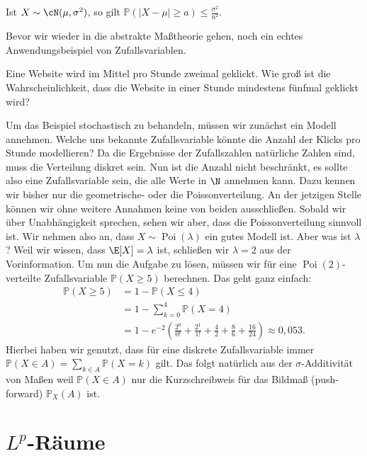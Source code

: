 \begin{beispiel1}
	Ist $ X \sim \cN(\mu, \sigma^2)$, so gilt $ \mathbb{P}(|X - \mu| \geq a) \leq \frac{\sigma^2}{a^2}$.
\end{beispiel1}
Bevor wir wieder in die abstrakte Ma\ss theorie gehen, noch ein echtes Anwendungsbeispiel von Zufallsvariablen.
\begin{beispiel}
	Eine Website wird im Mittel pro Stunde zweimal geklickt. Wie groß ist die Wahrscheinlichkeit, dass die Website in einer Stunde mindestens fünfmal geklickt wird?\smallskip
	
	Um das Beispiel stochastisch zu behandeln, m\"ussen wir zun\"achst ein Modell annehmen. Welche uns bekannte Zufallsvariable k\"onnte die Anzahl der Klicks pro Stunde modellieren? Da die Ergebnisse der Zufallszahlen nat\"urliche Zahlen sind, muss die Verteilung diskret sein. Nun ist die Anzahl nicht beschr\"ankt, es sollte also eine Zufallsvariable sein, die alle Werte in $\N$ annehmen kann. Dazu kennen wir bisher nur die geometrische- oder die Poissonverteilung. An der jetzigen Stelle k\"onnen wir ohne weitere Annahmen keine von beiden ausschlie\ss en. Sobald wir \"uber Unabh\"angigkeit sprechen, sehen wir aber, dass die Poissonverteilung sinnvoll ist. Wir nehmen also an, dass $X\sim \operatorname{Poi}(\lambda)$ ein gutes Modell ist. Aber was ist $\lambda$? Weil wir wissen, dass $\E[X]=\lambda$ ist, schlie\ss en wir $\lambda=2$ aus der Vorinformation. Um nun die Aufgabe zu l\"osen, m\"ussen wir f\"ur eine $\operatorname{Poi}(2)$-verteilte Zufallsvariable $\mathbb P(X\geq 5)$ berechnen. Das geht ganz einfach:
	\begin{align*}
	\mathbb{P}(X \geq 5) &= 1 - \mathbb{P}(X \leq 4)\\
	& = 1 - \sum\limits_{k=0}^{4} \mathbb{P}(X = 4)\\ 
	&= 1 - e^{-2} \left(\frac{2^0}{0!} + \frac{2^1}{1!} + \frac{4}{2} + \frac{8}{6} + \frac{16}{24}\right) \approx 0,053.
	\end{align*} 
	Hierbei haben wir genutzt, dass f\"ur eine diskrete Zufallsvariable immer $\mathbb P(X\in A)=\sum_{k\in A} \mathbb P(X=k)$ gilt. Das folgt nat\"urlich aus der $\sigma$-Additivit\"at von Ma\ss en weil $\mathbb P(X\in A)$ nur die Kurzschreibweis f\"ur das Bildma\ss{} (push-forward) $\mathbb P_X(A)$ ist. 
\end{beispiel}

\section{$L^p$-Räume}

